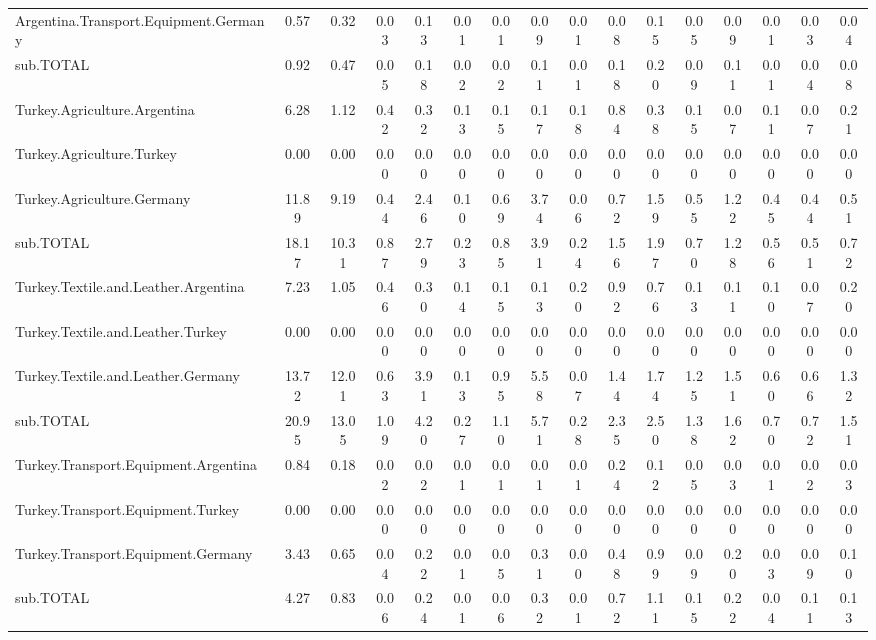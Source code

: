 \documentclass{article}
\begin{document}
\begin{landscape}
\begin{table}[htbp]
\begin{adjustwidth}{-1.15in}{-1.15in}
\begin{tabular}{lccccccccccccccc}
    Argentina.Transport.Equipment.Germany & 0.57  & 0.32  & 0.03  & 0.13  & 0.01  & 0.01  & 0.09  & 0.01  & 0.08  & 0.15  & 0.05  & 0.09  & 0.01  & 0.03  & 0.04 \\
    sub.TOTAL & 0.92  & 0.47  & 0.05  & 0.18  & 0.02  & 0.02  & 0.11  & 0.01  & 0.18  & 0.20  & 0.09  & 0.11  & 0.01  & 0.04  & 0.08 \\
    Turkey.Agriculture.Argentina & 6.28  & 1.12  & 0.42  & 0.32  & 0.13  & 0.15  & 0.17  & 0.18  & 0.84  & 0.38  & 0.15  & 0.07  & 0.11  & 0.07  & 0.21 \\
    Turkey.Agriculture.Turkey & 0.00  & 0.00  & 0.00  & 0.00  & 0.00  & 0.00  & 0.00  & 0.00  & 0.00  & 0.00  & 0.00  & 0.00  & 0.00  & 0.00  & 0.00 \\
    Turkey.Agriculture.Germany & 11.89 & 9.19  & 0.44  & 2.46  & 0.10  & 0.69  & 3.74  & 0.06  & 0.72  & 1.59  & 0.55  & 1.22  & 0.45  & 0.44  & 0.51 \\
    sub.TOTAL & 18.17 & 10.31 & 0.87  & 2.79  & 0.23  & 0.85  & 3.91  & 0.24  & 1.56  & 1.97  & 0.70  & 1.28  & 0.56  & 0.51  & 0.72 \\
    Turkey.Textile.and.Leather.Argentina & 7.23  & 1.05  & 0.46  & 0.30  & 0.14  & 0.15  & 0.13  & 0.20  & 0.92  & 0.76  & 0.13  & 0.11  & 0.10  & 0.07  & 0.20 \\
    Turkey.Textile.and.Leather.Turkey & 0.00  & 0.00  & 0.00  & 0.00  & 0.00  & 0.00  & 0.00  & 0.00  & 0.00  & 0.00  & 0.00  & 0.00  & 0.00  & 0.00  & 0.00 \\
    Turkey.Textile.and.Leather.Germany & 13.72 & 12.01 & 0.63  & 3.91  & 0.13  & 0.95  & 5.58  & 0.07  & 1.44  & 1.74  & 1.25  & 1.51  & 0.60  & 0.66  & 1.32 \\
    sub.TOTAL & 20.95 & 13.05 & 1.09  & 4.20  & 0.27  & 1.10  & 5.71  & 0.28  & 2.35  & 2.50  & 1.38  & 1.62  & 0.70  & 0.72  & 1.51 \\
    Turkey.Transport.Equipment.Argentina & 0.84  & 0.18  & 0.02  & 0.02  & 0.01  & 0.01  & 0.01  & 0.01  & 0.24  & 0.12  & 0.05  & 0.03  & 0.01  & 0.02  & 0.03 \\
    Turkey.Transport.Equipment.Turkey & 0.00  & 0.00  & 0.00  & 0.00  & 0.00  & 0.00  & 0.00  & 0.00  & 0.00  & 0.00  & 0.00  & 0.00  & 0.00  & 0.00  & 0.00 \\
    Turkey.Transport.Equipment.Germany & 3.43  & 0.65  & 0.04  & 0.22  & 0.01  & 0.05  & 0.31  & 0.00  & 0.48  & 0.99  & 0.09  & 0.20  & 0.03  & 0.09  & 0.10 \\
    sub.TOTAL & 4.27  & 0.83  & 0.06  & 0.24  & 0.01  & 0.06  & 0.32  & 0.01  & 0.72  & 1.11  & 0.15  & 0.22  & 0.04  & 0.11  & 0.13 \\

\end{tabular}
\end{adjustwidth}
\end{table}
\end{landscape}
\end{document}

